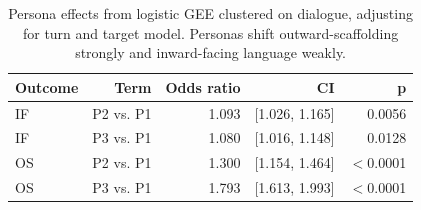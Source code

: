 \begin{table}[t]
\centering
\small
\caption{Persona effects from logistic GEE clustered on dialogue, adjusting for turn and target model. Personas shift outward-scaffolding strongly and inward-facing language weakly.}
\label{tab:gee_persona}
\begin{tabular}{lrrrr}
\toprule
Outcome & Term & Odds ratio & CI & p \\
\midrule
IF & P2 vs. P1 & 1.093 & [1.026, 1.165] & 0.0056 \\
IF & P3 vs. P1 & 1.080 & [1.016, 1.148] & 0.0128 \\
OS & P2 vs. P1 & 1.300 & [1.154, 1.464] & $<$0.0001 \\
OS & P3 vs. P1 & 1.793 & [1.613, 1.993] & $<$0.0001 \\
\bottomrule
\end{tabular}
\end{table}
